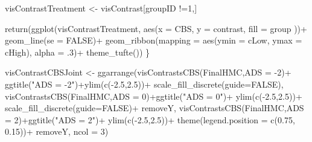 \documentclass[
  10pt,
  dvipsnames,enabledeprecatedfontcommands]{scrartcl}
\newenvironment{Shaded}{\begin{snugshade}}{\end{snugshade}}
\newcommand{\AttributeTok}[1]{\textcolor[rgb]{0.77,0.63,0.00}{#1}}
\newcommand{\ConstantTok}[1]{\textcolor[rgb]{0.00,0.00,0.00}{#1}}
\newcommand{\DecValTok}[1]{\textcolor[rgb]{0.00,0.00,0.81}{#1}}
\newcommand{\FloatTok}[1]{\textcolor[rgb]{0.00,0.00,0.81}{#1}}
\newcommand{\FunctionTok}[1]{\textcolor[rgb]{0.00,0.00,0.00}{#1}}
\newcommand{\NormalTok}[1]{#1}
\newcommand{\OtherTok}[1]{\textcolor[rgb]{0.56,0.35,0.01}{#1}}
\newcommand{\SpecialCharTok}[1]{\textcolor[rgb]{0.00,0.00,0.00}{#1}}
\newcommand{\StringTok}[1]{\textcolor[rgb]{0.31,0.60,0.02}{#1}}
\begin{document}
\begin{Shaded}
\begin{Highlighting}[]
\NormalTok{  visContrastTreatment }\OtherTok{\textless{}{-}}\NormalTok{ visContrast[groupID }\SpecialCharTok{!=}\DecValTok{1}\NormalTok{,]}

  \FunctionTok{return}\NormalTok{(}\FunctionTok{ggplot}\NormalTok{(visContrastTreatment, }\FunctionTok{aes}\NormalTok{(}\AttributeTok{x =}\NormalTok{ CBS, }\AttributeTok{y =}\NormalTok{ contrast, }\AttributeTok{fill =}\NormalTok{ group ))}\SpecialCharTok{+}
           \FunctionTok{geom\_line}\NormalTok{(}\AttributeTok{se =} \ConstantTok{FALSE}\NormalTok{)}\SpecialCharTok{+}
            \FunctionTok{geom\_ribbon}\NormalTok{(}\AttributeTok{mapping =} 
        \FunctionTok{aes}\NormalTok{(}\AttributeTok{ymin =}\NormalTok{ cLow, }\AttributeTok{ymax =}\NormalTok{ cHigh),  }
         \AttributeTok{alpha =}\NormalTok{ .}\DecValTok{3}\NormalTok{)}\SpecialCharTok{+}
          \FunctionTok{theme\_tufte}\NormalTok{())}
\NormalTok{\}}


\NormalTok{visContrastCBSJoint }\OtherTok{\textless{}{-}} \FunctionTok{ggarrange}\NormalTok{(}\FunctionTok{visContrastsCBS}\NormalTok{(FinalHMC,}\AttributeTok{ADS =} \SpecialCharTok{{-}}\DecValTok{2}\NormalTok{)}\SpecialCharTok{+}
      \FunctionTok{ggtitle}\NormalTok{(}\StringTok{"ADS = {-}2"}\NormalTok{)}\SpecialCharTok{+}\FunctionTok{ylim}\NormalTok{(}\FunctionTok{c}\NormalTok{(}\SpecialCharTok{{-}}\FloatTok{2.5}\NormalTok{,}\FloatTok{2.5}\NormalTok{))}\SpecialCharTok{+} \FunctionTok{scale\_fill\_discrete}\NormalTok{(}\AttributeTok{guide=}\ConstantTok{FALSE}\NormalTok{),}
          \FunctionTok{visContrastsCBS}\NormalTok{(FinalHMC,}\AttributeTok{ADS =} \DecValTok{0}\NormalTok{)}\SpecialCharTok{+}\FunctionTok{ggtitle}\NormalTok{(}\StringTok{"ADS = 0"}\NormalTok{)}\SpecialCharTok{+}
        \FunctionTok{ylim}\NormalTok{(}\FunctionTok{c}\NormalTok{(}\SpecialCharTok{{-}}\FloatTok{2.5}\NormalTok{,}\FloatTok{2.5}\NormalTok{))}\SpecialCharTok{+} \FunctionTok{scale\_fill\_discrete}\NormalTok{(}\AttributeTok{guide=}\ConstantTok{FALSE}\NormalTok{)}\SpecialCharTok{+}
\NormalTok{        removeY,}
        \FunctionTok{visContrastsCBS}\NormalTok{(FinalHMC,}\AttributeTok{ADS =} \DecValTok{2}\NormalTok{)}\SpecialCharTok{+}\FunctionTok{ggtitle}\NormalTok{(}\StringTok{"ADS = 2"}\NormalTok{)}\SpecialCharTok{+}
        \FunctionTok{ylim}\NormalTok{(}\FunctionTok{c}\NormalTok{(}\SpecialCharTok{{-}}\FloatTok{2.5}\NormalTok{,}\FloatTok{2.5}\NormalTok{))}\SpecialCharTok{+} \FunctionTok{theme}\NormalTok{(}\AttributeTok{legend.position =} \FunctionTok{c}\NormalTok{(}\FloatTok{0.75}\NormalTok{, }\FloatTok{0.15}\NormalTok{))}\SpecialCharTok{+}
\NormalTok{        removeY, }\AttributeTok{ncol =} \DecValTok{3}\NormalTok{)}


\end{Highlighting}
\end{Shaded}
\end{document}

